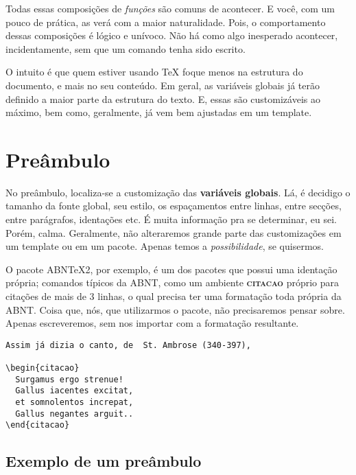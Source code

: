 \documentclass[12pt, brazilian, a5paper]{abntex2} %
\begin{document}
Todas essas composições de \textit{funções} são comuns de
acontecer. E você, com um pouco de prática, as verá com a maior
naturalidade. Pois, o comportamento dessas composições é lógico e
unívoco. Não há como algo inesperado acontecer, incidentamente, sem
que um comando tenha sido escrito.

O intuito é que quem estiver usando \TeX{} foque menos na estrutura do
documento, e mais no seu conteúdo. Em geral, as variáveis globais já
terão definido a maior parte da estrutura do texto. E, essas são
customizáveis ao máximo, bem como, geralmente, já vem bem ajustadas em um template.

\vspace{1cm}
\section{\huge{Preâmbulo}}

No preâmbulo, localiza-se a customização das \textbf{variáveis
  globais}. Lá, é decidigo o tamanho da fonte global, seu estilo, os
espaçamentos entre linhas, entre secções, entre parágrafos, identações
etc. É muita informação pra se determinar, eu sei. Porém,
calma. Geralmente, não alteraremos grande parte das customizações em
um template ou em um pacote. Apenas temos a \textit{possibilidade}, se
quisermos.

O pacote ABNTeX2, por exemplo, é um dos pacotes que possui uma
identação própria; comandos típicos da ABNT, como um ambiente
\textbf{{\scshape{citacao}}} próprio para citações de mais de 3
linhas, o qual precisa ter uma formatação toda própria da ABNT. Coisa
que, nós, que utilizarmos o pacote, não precisaremos pensar
sobre. Apenas escreveremos, sem nos importar com a formatação resultante.

\begin{verbatim}
Assim já dizia o canto, de  St. Ambrose (340-397),

\begin{citacao}
  Surgamus ergo strenue!
  Gallus iacentes excitat,
  et somnolentos increpat,
  Gallus negantes arguit..
\end{citacao}

\end{verbatim}


\subsection{\Large{Exemplo de um preâmbulo}}
\end{document}
